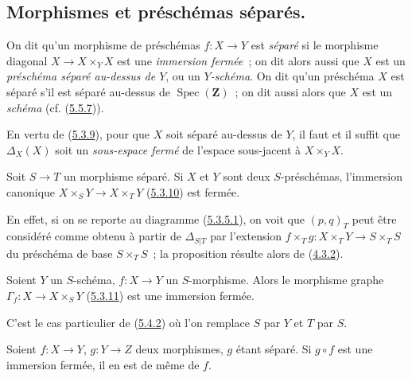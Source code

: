 \subsection{Morphismes et préschémas séparés.}
\label{subsection:I.5.4-fr}

\begin{definition}[5.4.1]
\label{I.5.4.1-fr}
On dit qu'un morphisme de préschémas $f:X\to Y$ est \emph{séparé} si le
morphisme diagonal $X\to X\times_Y X$ est une \emph{immersion fermée}~; on
dit alors aussi que $X$ est un \emph{préschéma séparé au-dessus de $Y$}, ou un
\emph{$Y$-schéma}. On dit qu'un préschéma $X$ est séparé s'il est séparé
au-dessus de $\operatorname{Spec}(\mathbf{Z})$~; on dit aussi alors que $X$
est un \emph{schéma} (cf. (\hyperref[I.5.5.7-fr]{5.5.7})).
\end{definition}

En vertu de (\hyperref[I.5.3.9-fr]{5.3.9}), pour que $X$ soit séparé au-dessus
de $Y$, il faut et il suffit que $\Delta_X(X)$ soit un \emph{sous-espace
fermé} de l'espace sous-jacent à $X\times_Y X$.

\begin{proposition}[5.4.2]
\label{I.5.4.2-fr}
Soit $S\to T$ un morphisme séparé. Si $X$ et $Y$ sont deux $S$-préschémas,
l'immersion canonique $X\times_S Y\to X\times_T Y$
(\hyperref[I.5.3.10-fr]{5.3.10}) est fermée.
\end{proposition}

En effet, si on se reporte au diagramme
(\hyperref[I.5.3.5.1-fr]{5.3.5.1}), on voit que $(p,q)_T$ peut être considéré
comme obtenu à partir de $\Delta_{S|T}$ par l'extension
$f\times_T g:X\times_T Y\to S\times_T S$ du préschéma de base $S\times_T S$~;
la proposition résulte alors de (\hyperref[I.4.3.2-fr]{4.3.2}).

\begin{corollary}[5.4.3]
\label{I.5.4.3-fr}
Soient $Y$ un $S$-schéma, $f:X\to Y$ un $S$-morphisme. Alors le morphisme
graphe $\Gamma_f:X\to X\times_S Y$ (\hyperref[I.5.3.11-fr]{5.3.11}) est une
immersion fermée.
\end{corollary}

C'est le cas particulier de (\hyperref[I.5.4.2-fr]{5.4.2}) où l'on remplace
$S$ par $Y$ et $T$ par $S$.

\begin{corollary}[5.4.4]
\label{I.5.4.4-fr}
Soient $f:X\to Y$, $g:Y\to Z$ deux morphismes, $g$ étant séparé. Si $g\circ f$
est une immersion fermée, il en est de même de $f$.
\end{corollary}

